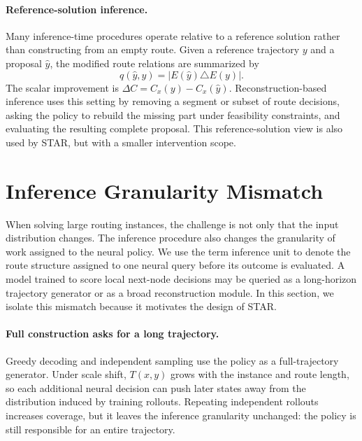 \documentclass[11pt]{article}
\newcommand{\method}{\textsc{STAR}}
\newcommand{\cost}{C}
\begin{document}
\paragraph{Reference-solution inference.}
Many inference-time procedures operate relative to a reference solution rather than constructing from an empty route. Given a reference trajectory $y$ and a proposal $\hat y$, the modified route relations are summarized by
\begin{equation}
  q(\hat y,y)=|E(\hat y)\triangle E(y)|.
  \label{eq:changed-relations}
\end{equation}
The scalar improvement is $\Delta C=\cost_x(y)-\cost_x(\hat y)$. Reconstruction-based inference uses this setting by removing a segment or subset of route decisions, asking the policy to rebuild the missing part under feasibility constraints, and evaluating the resulting complete proposal. This reference-solution view is also used by \method{}, but with a smaller intervention scope.

\section{Inference Granularity Mismatch}
\label{sec:bottleneck}

When solving large routing instances, the challenge is not only that the input distribution changes. The inference procedure also changes the granularity of work assigned to the neural policy. We use the term inference unit to denote the route structure assigned to one neural query before its outcome is evaluated. A model trained to score local next-node decisions may be queried as a long-horizon trajectory generator or as a broad reconstruction module. In this section, we isolate this mismatch because it motivates the design of \method{}.

\paragraph{Full construction asks for a long trajectory.}
Greedy decoding and independent sampling use the policy as a full-trajectory generator. Under scale shift, $T(x,y)$ grows with the instance and route length, so each additional neural decision can push later states away from the distribution induced by training rollouts. Repeating independent rollouts increases coverage, but it leaves the inference granularity unchanged: the policy is still responsible for an entire trajectory.
\end{document}

